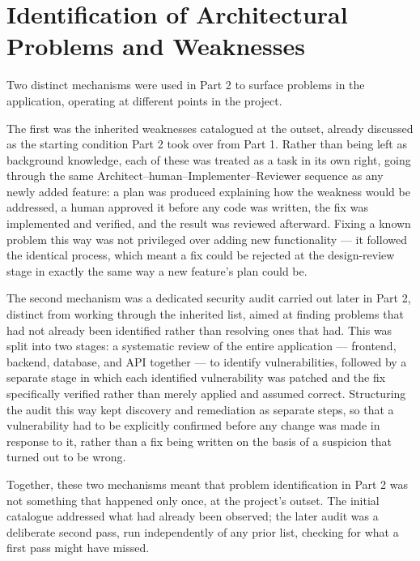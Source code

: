 \section{Identification of Architectural Problems and Weaknesses}

Two distinct mechanisms were used in Part 2 to surface problems in the application, operating at different points in the project.

The first was the inherited weaknesses catalogued at the outset, already discussed as the starting condition Part 2 took over from Part 1. Rather than being left as background knowledge, each of these was treated as a task in its own right, going through the same Architect--human--Implementer--Reviewer sequence as any newly added feature: a plan was produced explaining how the weakness would be addressed, a human approved it before any code was written, the fix was implemented and verified, and the result was reviewed afterward. Fixing a known problem this way was not privileged over adding new functionality --- it followed the identical process, which meant a fix could be rejected at the design-review stage in exactly the same way a new feature's plan could be.

The second mechanism was a dedicated security audit carried out later in Part 2, distinct from working through the inherited list, aimed at finding problems that had not already been identified rather than resolving ones that had. This was split into two stages: a systematic review of the entire application --- frontend, backend, database, and API together --- to identify vulnerabilities, followed by a separate stage in which each identified vulnerability was patched and the fix specifically verified rather than merely applied and assumed correct. Structuring the audit this way kept discovery and remediation as separate steps, so that a vulnerability had to be explicitly confirmed before any change was made in response to it, rather than a fix being written on the basis of a suspicion that turned out to be wrong.

Together, these two mechanisms meant that problem identification in Part 2 was not something that happened only once, at the project's outset. The initial catalogue addressed what had already been observed; the later audit was a deliberate second pass, run independently of any prior list, checking for what a first pass might have missed.

